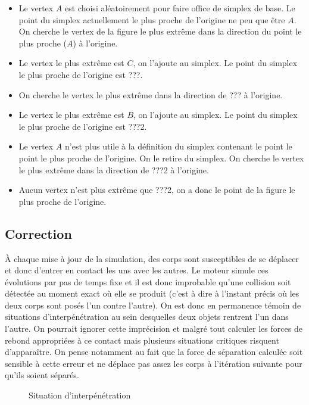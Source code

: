 \begin{itemize}
\item Le vertex $A$ est choisi aléatoirement pour faire office de
  simplex de base. Le point du simplex actuellement le plus proche de
  l'origine ne peu que être $A$. On cherche le vertex de la figure le
  plus extrême dans la direction du point le plus proche ($A$) à
  l'origine.
\item Le vertex le plus extrême est $C$, on l'ajoute au simplex. Le
  point du simplex le plus proche de l'origine est ???.
\item On cherche le vertex le plus extrême dans la direction de ??? à
  l'origine.
\item Le vertex le plus extrême est $B$, on l'ajoute au simplex. Le
  point du simplex le plus proche de l'origine est ???2.
\item Le vertex $A$ n'est plus utile à la définition du simplex
  contenant le point le point le plus proche de l'origine. On le
  retire du simplex. On cherche le vertex le plus extrême dans la
  direction de ???2 à l'origine.
\item Aucun vertex n'est plus extrême que ???2, on a donc le point de
  la figure le plus proche de l'origine.
\end{itemize}

\subsection{Correction}

\`A chaque mise à jour de la simulation, des corps sont susceptibles
de se déplacer et donc d'entrer en contact les uns avec les autres. Le
moteur simule ces évolutions par pas de temps fixe et il est donc
improbable qu'une collision soit détectée au moment exact o\`u elle se
produit (c'est à dire à l'instant précis o\`u les deux corps sont
posés l'un contre l'autre). On est donc en permanence témoin de
situations d'interpénétration au sein desquelles deux objets rentrent
l'un dans l'autre.  On pourrait ignorer cette imprécision et malgré
tout calculer les forces de rebond appropriées à ce contact mais
plusieurs situations critiques risquent d'apparaître. On pense
notamment au fait que la force de séparation calculée soit sensible à
cette erreur et ne déplace pas assez les corps à l'itération suivante
pour qu'ils soient séparés.

\begin{figure}
  \centering
  
  \caption{Situation d'interpénétration}
\end{figure}

